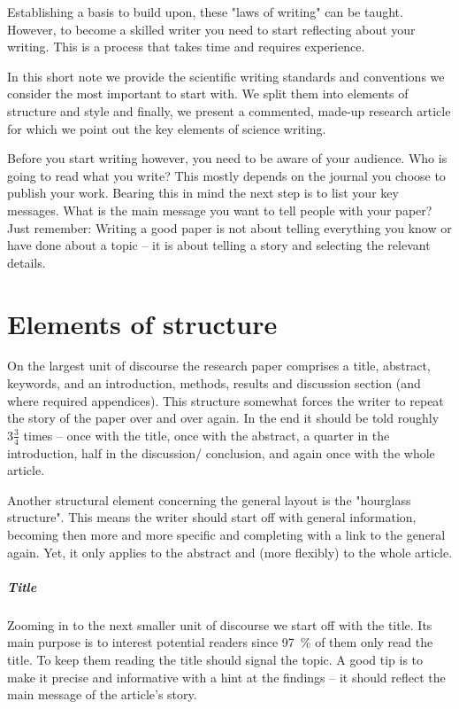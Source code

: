 \documentclass[justified, notoc]{tufte-book} %
\begin{document}
\begin{fullwidth}
Establishing a basis to build upon, these "laws of writing" can be taught. However, to become a skilled writer you need to start reflecting about your writing. This is a process that takes time and requires experience. 

In this short note we provide the scientific writing standards and conventions we consider the most important to start with. We split them into elements of structure and style and finally, we present a commented, made-up research article for which we point out the key elements of science writing.

Before you start writing however, you need to be aware of your audience. Who is going to read what you write? This mostly depends on the journal you choose to publish your work. Bearing this in mind the next step is to list your key messages. What is the main message you want to tell people with your paper? Just remember: Writing a good paper is not about telling everything you know or have done about a topic -- it is about telling a story and selecting the relevant details.
\end{fullwidth}

\chapter{Elements of structure}   
On the largest unit of discourse the research paper comprises a title, abstract, keywords, and an introduction, methods, results and discussion section (and where required appendices). 
This structure somewhat forces the writer to repeat the story of the paper over and over again. In the end  it should be told roughly $3\frac{3}{4}$ times -- once with the title, once with the abstract, a quarter in the introduction, half in the discussion/ conclusion, and again once with the whole article.

Another structural element concerning the general layout is the "hourglass structure". This means the writer should start off with general information, becoming then more and more specific and completing with a link to the general again. Yet, it only applies to the abstract and (more flexibly) to the whole article.\\
 
\paragraph{Title}
Zooming in to the next smaller unit of discourse we start off with the title. %
Its main purpose is to interest potential readers since 97~\%  of them only read the title. To keep them reading the title should signal the topic. A good tip is to make it precise and informative with a hint at the findings -- it should reflect the main message of the article's story.\\
\end{document}
